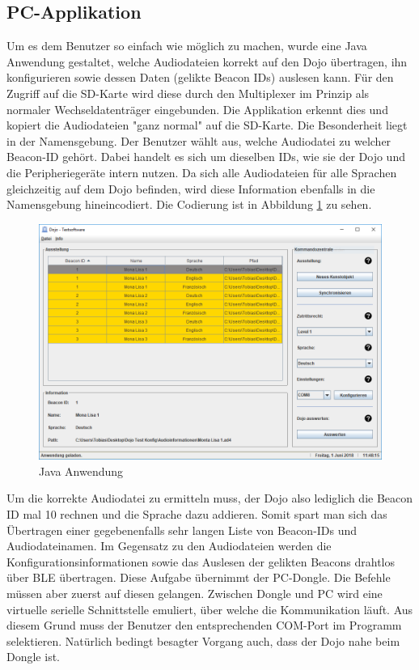 \subsection{PC-Applikation}
Um es dem Benutzer so einfach wie möglich zu machen, wurde eine Java Anwendung gestaltet, welche Audiodateien korrekt auf den Dojo übertragen, ihn konfigurieren sowie dessen Daten (gelikte Beacon IDs) auslesen kann.
Für den Zugriff auf die SD-Karte wird diese durch den Multiplexer im Prinzip als normaler Wechseldatenträger eingebunden. Die Applikation erkennt dies und kopiert die Audiodateien "ganz normal" auf die SD-Karte. Die Besonderheit liegt in der Namensgebung. Der Benutzer wählt aus, welche Audiodatei zu welcher Beacon-ID gehört. Dabei handelt es sich um dieselben IDs, wie sie der Dojo und die Peripheriegeräte intern nutzen. Da sich alle Audiodateien für alle Sprachen gleichzeitig auf dem Dojo befinden, wird diese Information ebenfalls in die Namensgebung hineincodiert. Die Codierung ist in Abbildung \ref{fig:soft_5} zu sehen.
\begin{figure}[h]
	\centering
	\includegraphics[width=\textwidth]{graphics/Java_Anwendung.png}
	\caption{Java Anwendung}
	\label{fig:soft_5}
\end{figure}
Um die korrekte Audiodatei zu ermitteln muss, der Dojo also lediglich die Beacon ID mal 10 rechnen und die Sprache dazu addieren. Somit spart man sich das Übertragen einer gegebenenfalls sehr langen Liste von Beacon-IDs und Audiodateinamen.
Im Gegensatz zu den Audiodateien werden die Konfigurationsinformationen sowie das Auslesen der gelikten Beacons drahtlos über BLE übertragen. Diese Aufgabe übernimmt der PC-Dongle. Die Befehle müssen aber zuerst auf diesen gelangen. Zwischen Dongle und PC wird eine virtuelle serielle Schnittstelle emuliert, über welche die Kommunikation läuft. Aus diesem Grund muss der Benutzer den entsprechenden COM-Port im Programm selektieren. Natürlich bedingt besagter Vorgang auch, dass der Dojo nahe beim Dongle ist.
